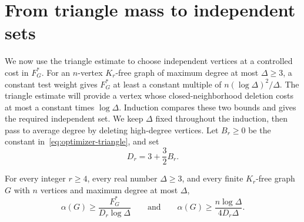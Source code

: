 \section{From triangle mass to independent sets}
\label{sec:closure}

We now use the triangle estimate to choose independent vertices at a
controlled cost in $F_G^*$. For an $n$-vertex $K_r$-free graph of maximum
degree at most $\Delta\ge3$,
a constant test weight gives $F_G^*$ at least a constant multiple of
$n(\log\Delta)^2/\Delta$. The triangle estimate will provide a vertex
whose closed-neighborhood deletion costs at most a constant times
$\log\Delta$. Induction compares these two bounds and gives the required
independent set. We keep $\Delta$ fixed throughout the induction, then
pass to average degree by deleting high-degree vertices.
Let $B_r\ge0$ be the constant in~\eqref{eq:optimizer-triangle}, and set
\begin{equation}
 D_r=3+\frac32 B_r.
 \label{eq:independence-constant}
\end{equation}

\begin{proposition}\label{prop:maximum-degree}
For every integer $r\ge4$, every real number $\Delta\ge3$, and every finite $K_r$-free graph $G$
with $n$ vertices and maximum degree at most $\Delta$,
\[
 \alpha(G)\ge \frac{F_G^*}{D_r\log\Delta}
 \qquad\text{and}\qquad
 \alpha(G)\ge \frac{n\log\Delta}{4D_r\Delta}.
\]
\end{proposition}

